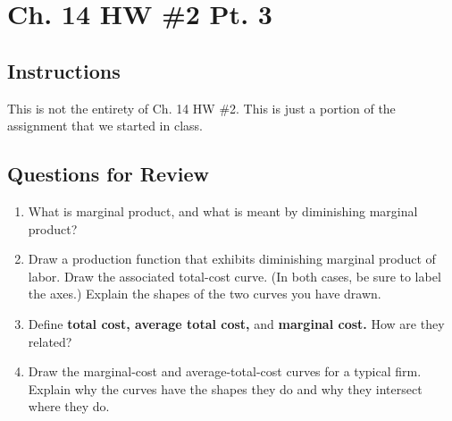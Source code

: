 \documentclass{article}
\begin{document}

\section*{Ch. 14 HW \#2 Pt. 3}

\subsection*{Instructions}

This is not the entirety of Ch. 14 HW \#2. This is just a portion of the assignment that we started in class.

\subsection*{Questions for Review}

\begin{enumerate}

\item What is marginal product, and what is meant by diminishing marginal product?

\item Draw a production function that exhibits diminishing marginal product of labor. Draw the associated total-cost curve. (In both cases, be sure to label the axes.) Explain the shapes of the two curves you have drawn.

\item Define \textbf{total cost, average total cost,} and \textbf{marginal cost.} How are they related?

\item Draw the marginal-cost and average-total-cost curves for a typical firm. Explain why the curves have the shapes they do and why they intersect where they do.

\end{enumerate}
\end{document}
